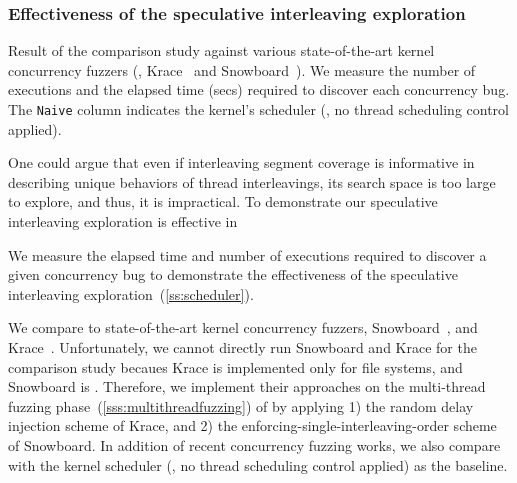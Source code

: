 %




%






\subsubsection{Effectiveness of the speculative interleaving
  exploration}
\label{sss:interleavingsearch}
%
%
\begin{table}
  \centering
  
  \caption{Result of the comparison study against various
    state-of-the-art kernel concurrency fuzzers (\ie,
    Krace~\cite{krace} and Snowboard~\cite{snowboard}). We measure the
    number of executions and the elapsed time (secs) required to
    discover each concurrency bug. The \texttt{Naive} column indicates
    the kernel's scheduler (\ie, no thread scheduling control applied).}
  \label{table:comparison-interleaving-search}
\end{table}
%
One could argue that even if interleaving segment coverage is
informative in describing unique behaviors of thread interleavings,
its search space is too large to explore, and thus, it is impractical.
%
To demonstrate our speculative interleaving exploration is effective
in

\dr{}
We measure the elapsed time and number of executions required to
discover a given concurrency bug to demonstrate the effectiveness of
the speculative interleaving exploration~(\autoref{ss:scheduler}).

%
We compare \sys to state-of-the-art kernel concurrency fuzzers,
Snowboard~\cite{snowboard}, and Krace~\cite{krace}.
%
Unfortunately, we cannot directly run Snowboard and Krace for the
comparison study becaues Krace is implemented only for file systems,
and Snowboard is \dr{}.
%
Therefore, we implement their approaches on the multi-thread fuzzing
phase~(\autoref{sss:multithreadfuzzing}) of \sys by applying 1) the
random delay injection scheme of Krace, and 2) the
enforcing-single-interleaving-order scheme of Snowboard.
%
In addition of recent concurrency fuzzing works, we also compare with
the kernel scheduler (\ie, no thread scheduling control applied) as
the baseline.




